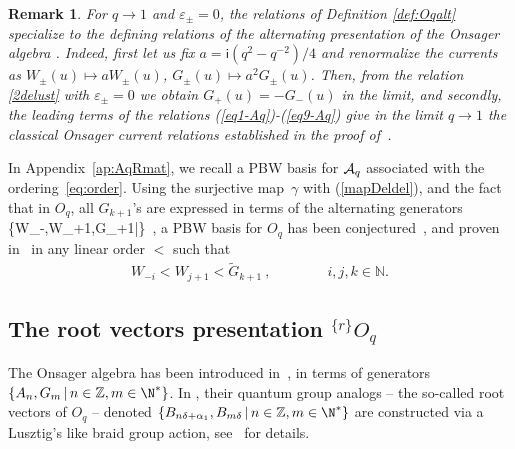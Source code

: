 \documentclass[11pt]{amsart}
\numberwithin{equation}{section}
\newtheorem{rem}[thm]{Remark}
\numberwithin{equation}{section}
\begin{document}
\begin{rem}\label{rem:q-Ons-limit}
	For $q\rightarrow 1$ and $\varepsilon_\pm=0$, the relations of Definition \ref{def:Oqalt} specialize to the defining relations of the alternating presentation of the Onsager algebra \cite[Def.\,4.1 \& Thm.\,2]{BC18}.  Indeed, first  let us fix $a=\textsf{i} (q^2-q^{-2})/4$ and renormalize the currents as $W_{\pm}(u)\mapsto a W_{\pm}(u)$, $G_{\pm}(u)\mapsto a^2 G_{\pm}(u)$. Then, from the relation \eqref{2delust} with $\varepsilon_\pm=0$ we obtain $G_+(u) = -G_-(u)$ in the limit, and secondly, the leading terms of  the relations (\ref{eq1-Aq})-(\ref{eq9-Aq}) give in the limit $q\to 1$ the classical Onsager current relations established in the proof of~\cite[Prop.\,4.1]{BC18}.
\end{rem}

In Appendix~\ref{ap:AqRmat}, we recall a PBW basis for ${\cal A}_q$ associated with the ordering~\eqref{eq:order}.  Using the surjective map~$\gamma$ with (\ref{mapDeldel}), and the fact~\cite[Prop.\,3.1]{BasBel} that in $O_q$, all $G_{k+1}$'s are expressed in terms of the alternating generators 
\beqa\label{eq:alt-gen-Oq}
\{W_{-\ell},W_{\ell+1},\tilde G_{\ell+1}|\ell {}\}\ ,
\eeqa
 a PBW basis for $O_q$ has been conjectured~\cite[Conj.\,1]{BasBel}, \cite[Conj.\,16.2]{Ter21b} and proven in~\cite[Thm.\,7.1]{Zh26b}
in any linear order $<$ such that
\begin{align}
	W_{-i} < W_{j+1} < {\tilde G}_{k+1}\ , \qquad \qquad i,j,k \in \mathbb N.
	\label{eq:orderOq}
\end{align}

\subsection{The root vectors presentation $^{\{r\}}O_q$}\label{sec:rootpres}
The 
Onsager algebra  has been introduced in~\cite{Ons44}, in terms of  generators $\{A_n,G_m\,|\,n\in {\mathbb Z}, m\in\N^*\}$.  
 In \cite{BK17}, their quantum group analogs -- the so-called root vectors of $O_q$ -- denoted $\{B_{n\delta+\alpha_1}, B_{m \delta} \, | \, n\in {\mathbb Z}, m\in \N^*\}$ are constructed via a Lusztig's like braid group action, see~\cite[Sec.\,2.3 \&\,3]{BK17} for details. 
 
\end{document}
